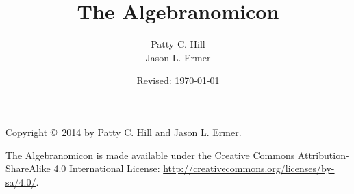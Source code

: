 % 
%

\title{The Algebranomicon}
\author{Patty C. Hill \\ Jason L. Ermer}
\date{Revised: \today}

\makeatletter
\let\TITLE\@title
\let\AUTHOR\@author
\let\DATE\@date
\makeatother


\pagestyle{empty}

%  
%

\color{covertextcolor}			%

{\fontsize{32pt}{0pt}\selectfont \textbf{\TITLE}\par}

\makebox[0pt][l]{\rule{1.5\textwidth}{1pt}}

\vfill
{\LARGE \textbf{\AUTHOR}\par}

\clearpage

\restoregeometry		%
\color{black}			%
\ClearWallPaper			%

%  
%
\maketitle

\clearpage

%  
%
\null
\vfill
\noindent
Copyright \copyright\ 2014 by Patty C. Hill and Jason L. Ermer.

The Algebranomicon is made available under the Creative Commons Attribution-ShareAlike 4.0 International License: \url{http://creativecommons.org/licenses/by-sa/4.0/}.

